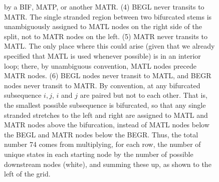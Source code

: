 \begin{figure}[htp]
{by a BIF, MATP, or another MATR. (4) BEGL never transits to MATR. The
single stranded region between two bifurcated stems is unambiguously
assigned to MATL nodes on the right side of the split, not to MATR
nodes on the left. (5) MATR never transits to MATL. The only place
where this could arise (given that we already specified that MATL is
used whenever possible) is in an interior loop; there, by unambiguous
convention, MATL nodes precede MATR nodes. (6) BEGL nodes never
transit to MATL, and BEGR nodes never transit to MATR. By convention,
at any bifurcated subsequence $i,j$, $i$ and $j$ are paired but not to
each other. That is, the smallest possible subsequence is bifurcated,
so that any single stranded stretches to the left and right are
assigned to MATL and MATR nodes above the bifurcation, instead of MATL
nodes below the BEGL and MATR nodes below the BEGR.
Thus, the total number 74 comes from multiplying, for each row, the
number of unique states in each starting node by the number of
possible downstream nodes (white), and summing these up, as shown to
the left of the grid.}
\label{fig:magic74}
\end{figure}
